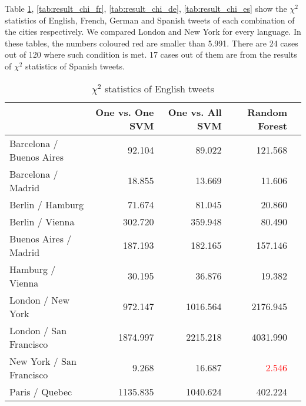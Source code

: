 Table \ref{tab:result_chi_en}, \ref{tab:result_chi_fr}, \ref{tab:result_chi_de}, \ref{tab:result_chi_es} show the $\chi^2$ statistics of English, French, German and Spanish tweets of each combination of the cities respectively.
We compared London and New York for every language.
In these tables, the numbers coloured red are smaller than 5.991.
There are 24 cases out of 120 where such condition is met.
17 cases out of them are from the results of $\chi^2$ statistics of Spanish tweets.

\begin{table}[ht]
	\caption{$\chi^2$ statistics of English tweets}
	\begin{tabular}{|l|r|r|r|r|} \hline
	{}&One vs. One SVM &One vs. All SVM&Random Forest\\ \hline
	Barcelona / Buenos Aires & 92.104 & 89.022 & 121.568 \\ \hline
	Barcelona / Madrid & 18.855 & 13.669 & 11.606 \\ \hline
	Berlin / Hamburg & 71.674 & 81.045 & 20.860 \\ \hline
	Berlin / Vienna & 302.720 & 359.948 & 80.490\\ \hline
	Buenos Aires / Madrid & 187.193 & 182.165 & 157.146 \\ \hline
	Hamburg / Vienna & 30.195 & 36.876 & 19.382 \\ \hline

	London / New York & 972.147 & 1016.564 & 2176.945 \\ \hline
	London / San Francisco & 1874.997 & 2215.218 & 4031.990 \\ \hline
	New York / San Francisco & 9.268 & 16.687 & \textcolor{red}{2.546} \\ \hline
	Paris / Quebec & 1135.835 & 1040.624 & 402.224 \\ \hline
	\end{tabular}
	\label{tab:result_chi_en}
\end{table}


